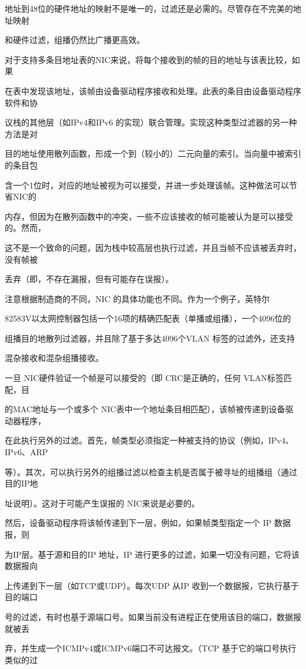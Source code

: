 地址到48位的硬件地址的映射不是唯一的，过滤还是必需的。尽管存在不完美的地址映射

和硬件过滤，组播仍然比广播更高效。

对于支持多条目地址表的NIC来说，将每个接收到的帧的目的地址与该表比较，如果

在表中发现该地址，该帧由设备驱动程序接收和处理。此表的条目由设备驱动程序软件和协

议栈的其他层（如IPv4和IPv6 的实现）联合管理。实现这种类型过滤器的另一种方法是对

目的地址使用散列函数，形成一个到（较小的）二元向量的索引。当向量中被索引的条目包

含一个1位时，对应的地址被视为可以接受，并进一步处理该帧。这种做法可以节省NIC的

内存，但因为在散列函数中的冲突，一些不应该接收的帧可能被认为是可以接受的。然而，

这不是一个致命的问题，因为栈中较高层也执行过滤，并且当帧不应该被丢弃时，没有帧被

丢弃（即，不存在漏报，但有可能存在误报）。

注意根据制造商的不同，NIC 的具体功能也不同。作为一个例子，英特尔

82583V以太网控制器包括一个16项的精确匹配表（单播或组播），一个4096位的

组播目的地散列过滤器，并且除了基于多达4096个VLAN 标签的过滤外，还支持

混杂接收和混杂组播接收。

一旦 NIC硬件验证一个帧是可以接受的（即 CRC是正确的，任何 VLAN标签匹配，目

的MAC地址与一个或多个 NIC表中一个地址条目相匹配），该帧被传递到设备驱动器程序，

在此执行另外的过滤。首先，帧类型必须指定一种被支持的协议（例如，IPv4、IPv6、ARP

等）。其次，可以执行另外的组播过滤以检查主机是否属于被寻址的组播组（通过目的IP地

址说明）。这对于可能产生误报的 NIC来说是必要的。

然后，设备驱动程序将该帧传递到下一层，例如，如果帧类型指定一个 IP 数据报，则

为IP层。基于源和目的IP 地址，IP 进行更多的过滤，如果一切没有问题，它将该数据报向

上传递到下一层（如TCP或UDP）。每次UDP 从IP 收到一个数据报，它执行基于目的端口

号的过滤，有时也基于源端口号。如果当前没有进程正在使用该目的端口，数据报就被丢

弃，并生成一个ICMPv4或ICMPv6端口不可达报文。（TCP 基于它的端口号执行类似的过


